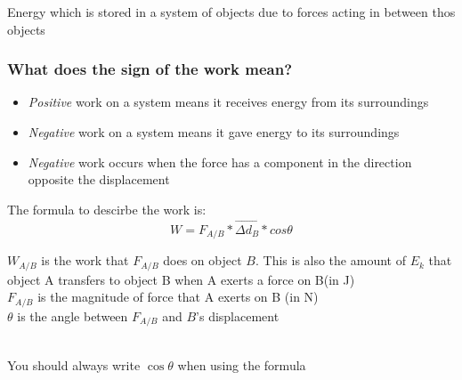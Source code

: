 \begin{definition}
   Energy which is stored in a system of objects due to forces acting in between thos objects
\end{definition}


\subsubsection{What does the sign of the work mean?}
\begin{itemize}
    \item \textit{Positive} work on a system means it receives energy from its surroundings
    \item \textit{Negative} work on a system means it gave energy to its surroundings 
    \item \textit{Negative} work occurs when the force has a component in the direction opposite the displacement
\end{itemize}
The formula to descirbe the work is:
\begin{equation}
    W = F_{A/B} * \vec{\Delta d_B} * cos\theta
\end{equation}
\begin{center}
    $W_{A/B}$ is the work that $F_{A/B}$ does on object $B$. This is also the amount of $E_k$ that object A transfers to object B 
    when A exerts a force on B(in J)\\

    $F_{A/B}$ is the magnitude of force that A exerts on B (in N)\\

    $\theta$ is the angle between $F_{A/B}$ and $B$'s displacement
\end{center}

\begin{remark}
    \\
    
    You should always write $\cos \theta$ when using the formula
\end{remark}

